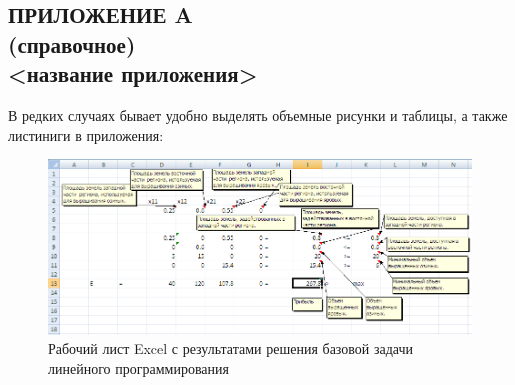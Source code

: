 \begin{landscape}
\section*{ПРИЛОЖЕНИЕ A \\ (справочное) \\ <название приложения>}

В редких случаях бывает удобно выделять объемные рисунки и таблицы, а также листиниги в приложения:
  
\begin{figure}[h]
\centering
  \includegraphics[width=1\linewidth]{pic/excel}
  \caption{Рабочий лист Excel с результатами решения базовой задачи линейного программирования}
\end{figure}

\end{landscape}

\newpage
